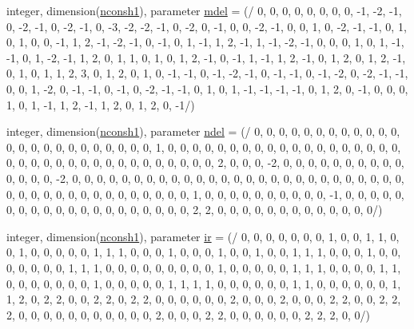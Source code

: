 \begin{DoxyCompactItemize}
\item 
integer, dimension(\mbox{\hyperlink{namespacemoduletoga_a06e41646ba24c11ab2e1b513e5c1760c}{nconsh1}}), parameter \mbox{\hyperlink{namespacemoduletoga_aed174ad28ce23b2187ea9b5f64d81002}{mdel}} = (/ 0, 0, 0, 0, 0, 0, 0, 0, -\/1, -\/2, -\/1, 0, -\/2, -\/1, 0, -\/2, -\/1, 0, -\/3, -\/2, -\/2, -\/1, 0, -\/2, 0, -\/1, 0, 0, -\/2, -\/1, 0, 0, 1, 0, -\/2, -\/1, -\/1, 0, 1, 0, 1, 0, 0, -\/1, 1, 2, -\/1, -\/2, -\/1, 0, -\/1, 0, 1, -\/1, 1, 2, -\/1, 1, -\/1, -\/2, -\/1, 0, 0, 0, 1, 0, 1, -\/1, -\/1, 0, 1, -\/2, -\/1, 1, 2, 0, 1, 1, 0, 1, 0, 1, 2, -\/1, 0, -\/1, 1, -\/1, 1, 2, -\/1, 0, 1, 2, 0, 1, 2, -\/1, 0, 1, 0, 1, 1, 2, 3, 0, 1, 2, 0, 1, 0, -\/1, -\/1, 0, -\/1, -\/2, -\/1, 0, -\/1, -\/1, 0, -\/1, -\/2, 0, -\/2, -\/1, -\/1, 0, 0, 1, -\/2, 0, -\/1, -\/1, 0, -\/1, 0, -\/2, -\/1, -\/1, 0, 1, 0, 1, -\/1, -\/1, -\/1, -\/1, 0, 1, 2, 0, -\/1, 0, 0, 0, 1, 0, 1, -\/1, 1, 2, -\/1, 1, 2, 0, 1, 2, 0, -\/1/)
\item 
integer, dimension(\mbox{\hyperlink{namespacemoduletoga_a06e41646ba24c11ab2e1b513e5c1760c}{nconsh1}}), parameter \mbox{\hyperlink{namespacemoduletoga_ac23302539a90cdd733a9f3722c6c4027}{ndel}} = (/ 0, 0, 0, 0, 0, 0, 0, 0, 0, 0, 0, 0, 0, 0, 0, 0, 0, 0, 0, 0, 0, 0, 0, 0, 1, 0, 0, 0, 0, 0, 0, 0, 0, 0, 0, 0, 0, 0, 0, 0, 0, 0, 0, 0, 0, 0, 0, 0, 0, 0, 0, 0, 0, 0, 0, 0, 0, 0, 0, 0, 0, 2, 0, 0, 0, -\/2, 0, 0, 0, 0, 0, 0, 0, 0, 0, 0, 0, 0, 0, 0, -\/2, 0, 0, 0, 0, 0, 0, 0, 0, 0, 0, 0, 0, 0, 0, 0, 0, 0, 0, 0, 0, 0, 0, 0, 0, 0, 0, 0, 0, 0, 0, 0, 0, 0, 0, 0, 0, 0, 0, 0, 0, 0, 0, 1, 0, 0, 0, 0, 0, 0, 0, 0, 0, 0, -\/1, 0, 0, 0, 0, 0, 0, 0, 0, 0, 0, 0, 0, 0, 0, 0, 0, 0, 0, 0, 0, 2, 2, 0, 0, 0, 0, 0, 0, 0, 0, 0, 0, 0, 0, 0/)
\item 
integer, dimension(\mbox{\hyperlink{namespacemoduletoga_a06e41646ba24c11ab2e1b513e5c1760c}{nconsh1}}), parameter \mbox{\hyperlink{namespacemoduletoga_afa96c8025ac7806e5ab335cfa4132597}{ir}} = (/ 0, 0, 0, 0, 0, 0, 0, 1, 0, 0, 1, 1, 0, 0, 1, 0, 0, 0, 0, 0, 1, 1, 1, 0, 0, 0, 1, 0, 0, 0, 1, 0, 0, 1, 0, 0, 1, 1, 1, 0, 0, 0, 1, 0, 0, 0, 0, 0, 0, 0, 1, 1, 1, 0, 0, 0, 0, 0, 0, 0, 0, 0, 1, 0, 0, 0, 0, 0, 1, 1, 1, 0, 0, 0, 0, 1, 1, 0, 0, 0, 0, 0, 0, 0, 1, 0, 0, 0, 0, 0, 1, 1, 1, 1, 0, 0, 0, 0, 0, 0, 1, 1, 0, 0, 0, 0, 0, 0, 1, 1, 2, 0, 2, 2, 0, 0, 2, 2, 0, 2, 2, 0, 0, 0, 0, 0, 0, 2, 0, 0, 0, 2, 0, 0, 0, 2, 2, 0, 0, 2, 2, 2, 0, 0, 0, 0, 0, 0, 0, 0, 0, 0, 0, 2, 0, 0, 0, 2, 2, 0, 0, 0, 0, 0, 0, 2, 2, 2, 0, 0/)
\item 

\end{DoxyCompactItemize}
